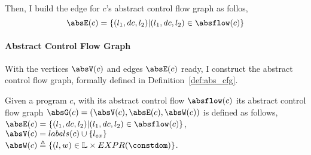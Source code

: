 Then, I build the edge for $c$'s abstract control flow graph as follos,
\[
  \absE(c) = \{(l_1, dc, l_2) | (l_1, dc, l_2) \in \absflow(c)\}
  \]

%


\paragraph{Abstract Control Flow Graph} 
With the vertices $\absV(c)$ and edges $\absE(c)$ ready, I construct the abstract control flow graph, formally 
defined in 
Definition~\ref{def:abs_cfg}.
\begin{defn}
\label{def:abs_cfg}
Given a program $c$, 
with its abstract control flow $\absflow(c)$
its abstract control flow graph $\absG(c) =(\absV(c), \absE(c), \absW(c))$ is defined as follows,
\\
%
$\absE(c) = \{(l_1, dc, l_2) | (l_1, dc, l_2) \in \absflow(c)\}$,
\\
$\absV(c) = labels(c)\cup\{l_{ex}\}$
\\
 $\absW(c) 
\triangleq \left\{ (l, w) \in \mathbb{L} \times EXPR(\constdom) \right\}$.
\end{defn}
% 
